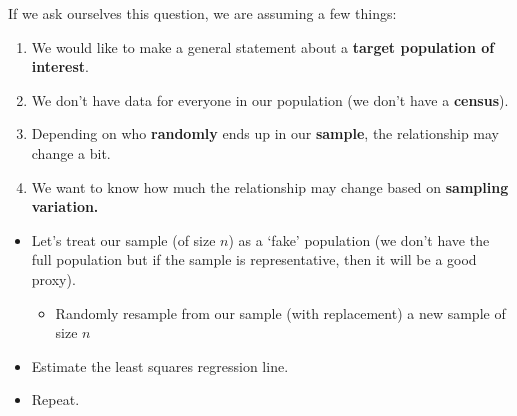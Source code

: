 \documentclass[
]{book}
\newenvironment{Shaded}{\begin{snugshade}}{\end{snugshade}}
\newcommand{\CommentTok}[1]{\textcolor[rgb]{0.56,0.35,0.01}{\textit{#1}}}
\newcommand{\DataTypeTok}[1]{\textcolor[rgb]{0.13,0.29,0.53}{#1}}
\newcommand{\DecValTok}[1]{\textcolor[rgb]{0.00,0.00,0.81}{#1}}
\newcommand{\KeywordTok}[1]{\textcolor[rgb]{0.13,0.29,0.53}{\textbf{#1}}}
\newcommand{\NormalTok}[1]{#1}
\newcommand{\OperatorTok}[1]{\textcolor[rgb]{0.81,0.36,0.00}{\textbf{#1}}}
\newcommand{\StringTok}[1]{\textcolor[rgb]{0.31,0.60,0.02}{#1}}
\providecommand{\tightlist}{%
  \setlength{\itemsep}{0pt}\setlength{\parskip}{0pt}}
\begin{document}
If we ask ourselves this question, we are assuming a few things:

\begin{enumerate}
\def\labelenumi{\arabic{enumi}.}
\item
  We would like to make a general statement about a \textbf{target population of interest}.
\item
  We don't have data for everyone in our population (we don't have a \textbf{census}).
\item
  Depending on who \textbf{randomly} ends up in our \textbf{sample}, the relationship may change a bit.
\item
  We want to know how much the relationship may change based on \textbf{sampling variation.}
\end{enumerate}

\begin{itemize}
\tightlist
\item
  Let's treat our sample (of size \(n\)) as a `fake' population (we don't have the full population but if the sample is representative, then it will be a good proxy).

  \begin{itemize}
  \tightlist
  \item
    Randomly resample from our sample (with replacement) a new sample of size \(n\)
  \end{itemize}
\item
  Estimate the least squares regression line.
\item
  Repeat.
\end{itemize}

\begin{Shaded}
\end{Shaded}
\end{document}

